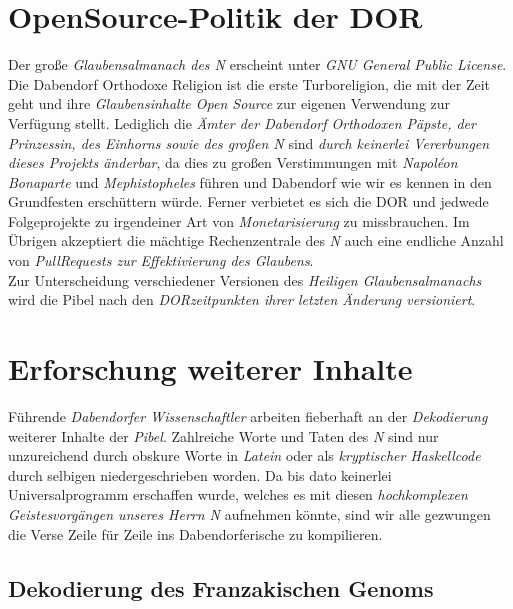 \section{{OpenSource-Politik der DOR}}
Der große \textit{Glaubensalmanach des N} erscheint unter \textit{GNU General Public License}. Die Dabendorf Orthodoxe Religion ist die erste Turboreligion, die mit der Zeit geht und ihre \textit{Glaubensinhalte Open Source} zur eigenen Verwendung zur Verfügung stellt. Lediglich die \textit{Ämter der Dabendorf Orthodoxen Päpste, der Prinzessin, des Einhorns sowie des großen N} sind \textit{durch keinerlei Vererbungen dieses Projekts änderbar}, da dies zu großen Verstimmungen mit \textit{Napoléon Bonaparte} und \textit{Mephistopheles} führen und Dabendorf wie wir es kennen in den Grundfesten erschüttern würde. Ferner verbietet es sich die DOR und jedwede Folgeprojekte zu irgendeiner Art von \textit{Monetarisierung} zu missbrauchen. Im Übrigen akzeptiert die mächtige Rechenzentrale des \textit{N} auch eine endliche Anzahl von \textit{PullRequests zur Effektivierung des Glaubens}.\\
Zur Unterscheidung verschiedener Versionen des \textit{Heiligen Glaubensalmanachs} wird die Pibel nach den \textit{DORzeitpunkten ihrer letzten Änderung versioniert}.

\section{{Erforschung weiterer Inhalte}}
Führende \textit{Dabendorfer Wissenschaftler} arbeiten fieberhaft an der \textit{Dekodierung} weiterer Inhalte der \textit{Pibel}. Zahlreiche Worte und Taten des \textit{N} sind nur unzureichend durch obskure Worte in \textit{Latein} oder als \textit{kryptischer Haskellcode} durch selbigen niedergeschrieben worden. Da bis dato keinerlei Universalprogramm erschaffen wurde, welches es mit diesen \textit{hochkomplexen Geistesvorgängen unseres Herrn N} aufnehmen könnte, sind wir alle gezwungen die Verse Zeile für Zeile ins Dabendorferische zu kompilieren.

\subsection{{Dekodierung des Franzakischen Genoms}}\label{FranzGenom}%
\lipsum[4]